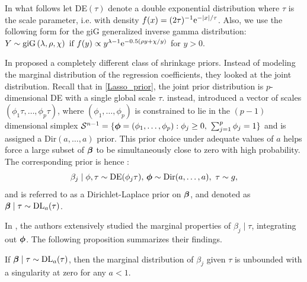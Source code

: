 \documentclass[chapters]{uamaththesis}
\begin{document}
In what follows let \rm{DE}$(\tau )$ denote a double exponential distribution where $\tau$ is the scale parameter, \rm{i.e.}  with density $f(x) = (2\tau)^{-1} {\rm e}^{-\lvert x\rvert/ \tau }$. Also, we use the following form for the \rm{giG} generalized inverse gamma distribution: $Y\sim\text{\rm{giG}} \left(\lambda,\rho , \chi \right) \text{ if } f(y) \propto y^{\lambda - 1} {\rm e}^{-0.5 \left( \rho y + \chi /y \right) }  $ for $y > 0$.

In \cite{bhattacharya2014dirichlet} proposed a completely different class of shrinkage priors. Instead of modeling the marginal distribution of the regression coefficients, they looked at the joint distribution. Recall that in \ref{Lasso_prior}, the joint prior distribution is $p$-dimensional \rm{DE} with a single global scale $\tau$. \cite{bhattacharya2014dirichlet} instead, introduced a vector of scales $\left( \phi_1 \tau , \ldots , \phi_p \tau \right)$, where $ \left( \phi_1 , \ldots , \phi_p \right) $ is constrained to lie in the $ (p - 1) $ dimensional simplex $\mathcal{S}^{n-1} = \{ \boldsymbol{\phi} = (\phi_1 , \ldots , \phi_p ) : \phi_j \geq 0, \ \sum_{j = 1}^{p} \phi_j = 1 \}$ and is assigned a \rm{Dir}$(a, \ldots ,a)$ prior. This prior choice under adequate values of $a$ helps force a large subset of $\boldsymbol{\beta}$ to be simultaneously close to zero with high probability. The corresponding prior is hence :$$ \beta_j \mid \phi , \tau \sim \text{\rm{DE}}(\phi_j \tau), \, \boldsymbol{\phi} \sim \text{\rm{Dir}}(a, \ldots ,a), \ \tau \sim g, $$ and is referred to as a Dirichlet-Laplace prior on $\boldsymbol{\beta}$, and denoted as $\boldsymbol{\beta} \mid \tau \sim \text{\rm{DL}}_a(\tau)$.

In \citep{bhattacharya2014dirichlet}, the authors extensively studied the marginal properties of $\beta_j \mid \tau$, integrating out $\boldsymbol{\phi}$. The following proposition summarizes their findings.

\begin{proposition}\label{DL_prior_carac}
If $\boldsymbol{\beta} \mid \tau \sim \text{\rm{DL}}_a(\tau)$, then the marginal distribution of $\beta_j$ given $\tau$ is unbounded with a singularity at zero for any $a < 1$.
\end{proposition}
\end{document}
